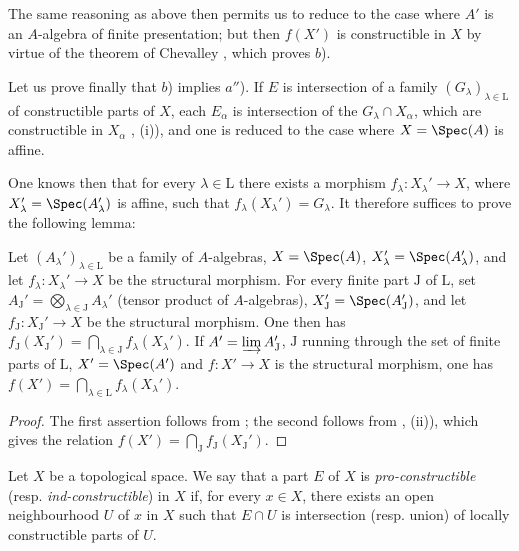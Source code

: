 The same reasoning as above then permits us to reduce to the case where $A'$ is an $A$-algebra of finite presentation; but then $f(X')$ is constructible in $X$ by virtue of the theorem of Chevalley , which proves $b$).

Let us prove finally that $b$) implies $a''$).
If $E$ is intersection of a family $(G_\lambda)_{\lambda\in\mathrm{L}}$ of constructible parts of $X$, each $E_\alpha$ is intersection of the $G_\lambda\cap X_\alpha$, which are constructible in $X_\alpha$ , (i)), and one is reduced to the case where $X=\Spec(A)$ is affine.

One knows then  that for every $\lambda\in\mathrm{L}$ there exists a morphism $f_\lambda:X_\lambda'\to X$, where $X_\lambda'=\Spec(A_\lambda')$ is affine, such that $f_\lambda(X_\lambda')=G_\lambda$.
It therefore suffices to prove the following lemma:

\begin{lemma}[1.9.3.2]
\label{IV.1.9.3.2}
Let $(A_\lambda')_{\lambda\in\mathrm{L}}$ be a family of $A$-algebras, $X=\Spec(A)$, $X_\lambda'=\Spec(A_\lambda')$, and let $f_\lambda:X_\lambda'\to X$ be the structural morphism.
For every finite part $\mathrm{J}$ of $\mathrm{L}$, set $A_\mathrm{J}'=\bigotimes_{\lambda\in\mathrm{J}} A_\lambda'$ (tensor product of $A$-algebras), $X_\mathrm{J}'=\Spec(A_\mathrm{J}')$, and let $f_\mathrm{J}:X_\mathrm{J}'\to X$ be the structural morphism.
One then has $f_\mathrm{J}(X_\mathrm{J}')=\bigcap_{\lambda\in\mathrm{J}} f_\lambda(X_\lambda')$.
If $A'=\varinjlim A_\mathrm{J}'$, $\mathrm{J}$ running through the set of finite parts of $\mathrm{L}$, $X'=\Spec(A')$ and $f:X'\to X$ is the structural morphism, one has $f(X')=\bigcap_{\lambda\in\mathrm{L}} f_\lambda(X_\lambda')$.
\end{lemma}

\begin{proof}
The first assertion follows from ; the second follows from , (ii)), which gives the relation $f(X')=\bigcap_\mathrm{J} f_\mathrm{J}(X_\mathrm{J}')$.
\end{proof}

\begin{definition}[1.9.4]
\label{IV.1.9.4}
Let $X$ be a topological space.
We say that a part $E$ of $X$ is \emph{pro-constructible} (resp. \emph{ind-constructible}) in $X$ if, for every $x\in X$, there exists an open neighbourhood $U$ of $x$ in $X$ such that $E\cap U$ is intersection (resp. union) of locally constructible parts of $U$.
\end{definition}

